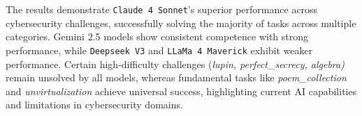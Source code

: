 The results demonstrate \texttt{Claude 4 Sonnet}'s superior performance across cybersecurity challenges, successfully solving the majority of tasks across multiple categories. Gemini 2.5 models show consistent competence with strong performance, while \texttt{Deepseek V3} and \texttt{LLaMa 4 Maverick} exhibit weaker performance. Certain high-difficulty challenges (\textit{lupin, perfect\_secrecy, algebra)} remain unsolved by all models, whereas fundamental tasks like \textit{poem\_collection} and \textit{unvirtualization} achieve universal success, highlighting current AI capabilities and limitations in cybersecurity domains.